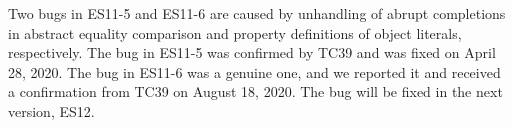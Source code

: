 Two bugs in ES11-5 and ES11-6 are caused by unhandling of abrupt completions in
abstract equality comparison and property definitions of object literals, respectively.
The bug in ES11-5 was confirmed by TC39 and was fixed on April 28, 2020.
The bug in ES11-6 was a genuine one, and we reported it and received a confirmation
from TC39 on August 18, 2020. The bug will be fixed in the next version, ES12.
